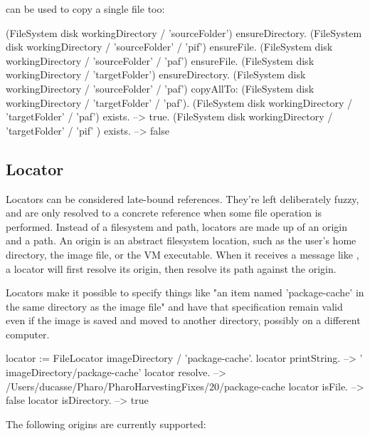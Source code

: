 \documentclass[a4paper,10pt,twoside]{book}
\begin{document}
 can be used to copy a single file too:

\begin{code}{}
(FileSystem disk workingDirectory / 'sourceFolder') ensureDirectory. 
(FileSystem disk workingDirectory /  'sourceFolder' / 'pif') ensureFile.
(FileSystem disk workingDirectory /  'sourceFolder' / 'paf') ensureFile.
(FileSystem disk workingDirectory / 'targetFolder') ensureDirectory. 
(FileSystem disk workingDirectory / 'sourceFolder' / 'paf') copyAllTo: (FileSystem disk workingDirectory / 'targetFolder' / 'paf').
(FileSystem disk workingDirectory /  'targetFolder' / 'paf') exists.
	--> true.
(FileSystem disk workingDirectory /  'targetFolder' / 'pif' ) exists.
  --> false
\end{code}

\subsection{Locator}

Locators can be considered late-bound references. They're left deliberately fuzzy, and are only resolved to a concrete reference when some file operation is performed. Instead of a filesystem and path, locators are made up of an origin and a path. An origin is an abstract filesystem location, such as the user's home directory, the image file, or the VM executable. When it receives a message like , a locator will first resolve its origin, then resolve its path against the origin.

Locators make it possible to specify things like "an item named 'package-cache' in the same directory as the image file" and have that specification remain valid even if the image is saved and moved to another directory, possibly on a different computer.

\begin{code}{}
    locator := FileLocator imageDirectory / 'package-cache'.
    locator printString.             --> ' {imageDirectory}/package-cache'
    locator resolve.                 -->  /Users/ducasse/Pharo/PharoHarvestingFixes/20/package-cache
    locator isFile.                  --> false
    locator isDirectory.             --> true
\end{code}	

The following origins are currently supported:
\end{document}
